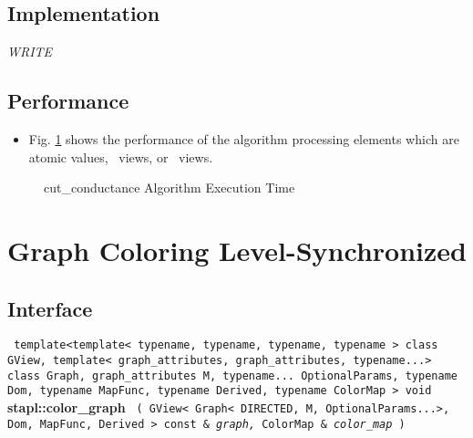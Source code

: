 \subsection{Implementation} \label{sec-cut-cond-alg-impl}

\textit{WRITE}

\subsection{Performance} \label{sec-cut-cond-alg-perf}

\begin{itemize}
\item
Fig. \ref{fig:cut-cond-alg-exec-exper}
shows the performance of the algorithm processing
elements which are atomic values, \stl\ views, or \stapl\ views.
\end{itemize}

\begin{figure}[p]
\caption{ cut\_conductance Algorithm Execution Time}
\label{fig:cut-cond-alg-exec-exper}
\end{figure}


\section{ Graph Coloring Level-Synchronized}
\label{sec-color-graf-alg}

\subsection{Interface} \label{sec-color-graf-alg-inter}

\noindent
\texttt{%
template<template< typename, typename, typename, typename > 
\newline
class GView, template< graph\_attributes, graph\_attributes, typename...> 
\newline
class Graph, graph\_attributes M, typename... OptionalParams, 
\newline
typename Dom, typename MapFunc, typename Derived, typename ColorMap >
\newline
void 
}
\newline
\textbf{stapl::color\_graph}%
\newline
\texttt{%
(
GView< Graph< DIRECTED, M, OptionalParams...>, Dom, MapFunc, Derived > const \&
\textit{graph,}%
ColorMap \&
\textit{color\_map}%
)     
}
\vspace{0.4cm}

